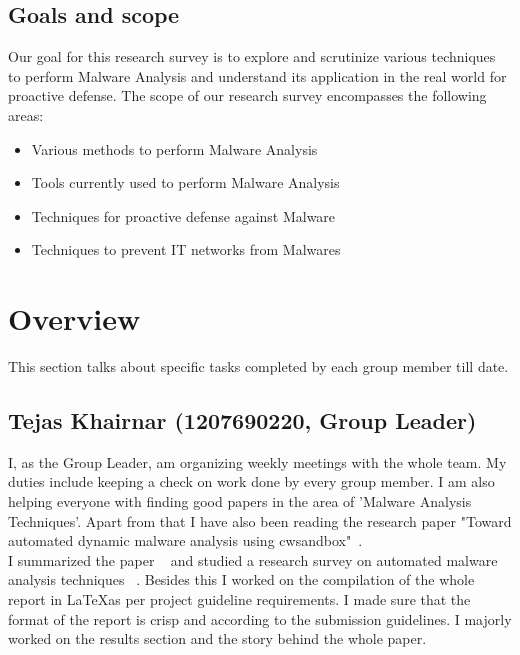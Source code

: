 \documentclass[11pt]{article}
\begin{document}
	\subsection{Goals and scope}
	Our goal for this research survey is to explore and scrutinize various techniques to perform Malware Analysis and understand its application in the real world for proactive defense.
	The scope of our research survey encompasses the following areas:
	\begin{itemize}[noitemsep]
		\item{Various methods to perform Malware Analysis}
		\item{Tools currently used to perform Malware Analysis} 
		\item{Techniques for proactive defense against Malware}
		\item{Techniques to prevent IT networks from Malwares}
	\end{itemize}


\section{Overview}
This section talks about specific tasks completed by each group member till date.
\subsection{Tejas Khairnar (1207690220, Group Leader)}
I, as the Group Leader, am organizing weekly meetings with the whole team. My duties include keeping a check on work done by every group member.
I am also helping everyone with finding good papers in the area of 'Malware Analysis Techniques'. Apart from that I have also been reading the research paper "Toward automated dynamic malware analysis using cwsandbox"~\cite{willems2007toward}. \\
I summarized the paper ~\cite{willems2007toward} and studied a research survey on automated malware analysis techniques ~\cite{egele2012survey}. Besides this I worked on the compilation of the whole report in \LaTeX as per project guideline requirements. I made sure that the format of the report is crisp and according to the submission guidelines. I majorly worked on the results section and the story behind the whole paper. 
\end{document}
